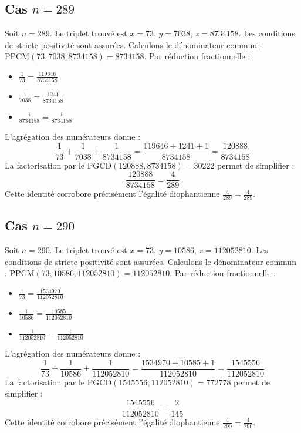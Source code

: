 \documentclass[11pt,a4paper]{article}
\begin{document}
\subsection{Cas $n = 289$}
Soit $n = 289$. Le triplet trouvé est $x = 73$, $y = 7038$, $z = 8734158$.
Les conditions de stricte positivité sont assurées.
Calculons le dénominateur commun : $\text{PPCM}(73, 7038, 8734158) = 8734158$.
Par réduction fractionnelle :
\begin{itemize}
    \item $\frac{1}{73} = \frac{119646}{8734158}$
    \item $\frac{1}{7038} = \frac{1241}{8734158}$
    \item $\frac{1}{8734158} = \frac{1}{8734158}$
\end{itemize}
L'agrégation des numérateurs donne :
$$ \frac{1}{73} + \frac{1}{7038} + \frac{1}{8734158} = \frac{119646 + 1241 + 1}{8734158} = \frac{120888}{8734158} $$
La factorisation par le $\text{PGCD}(120888, 8734158) = 30222$ permet de simplifier :
$$ \frac{120888}{8734158} = \frac{4}{289} $$
Cette identité corrobore précisément l'égalité diophantienne $\frac{4}{289} = \frac{4}{289}$.

\subsection{Cas $n = 290$}
Soit $n = 290$. Le triplet trouvé est $x = 73$, $y = 10586$, $z = 112052810$.
Les conditions de stricte positivité sont assurées.
Calculons le dénominateur commun : $\text{PPCM}(73, 10586, 112052810) = 112052810$.
Par réduction fractionnelle :
\begin{itemize}
    \item $\frac{1}{73} = \frac{1534970}{112052810}$
    \item $\frac{1}{10586} = \frac{10585}{112052810}$
    \item $\frac{1}{112052810} = \frac{1}{112052810}$
\end{itemize}
L'agrégation des numérateurs donne :
$$ \frac{1}{73} + \frac{1}{10586} + \frac{1}{112052810} = \frac{1534970 + 10585 + 1}{112052810} = \frac{1545556}{112052810} $$
La factorisation par le $\text{PGCD}(1545556, 112052810) = 772778$ permet de simplifier :
$$ \frac{1545556}{112052810} = \frac{2}{145} $$
Cette identité corrobore précisément l'égalité diophantienne $\frac{4}{290} = \frac{4}{290}$.
\end{document}
